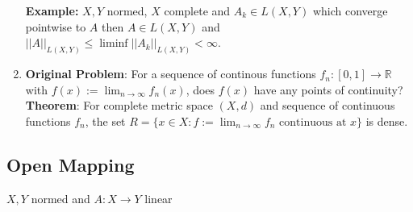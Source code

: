 \documentclass{article}
\begin{document}
\begin{enumerate}
    \textbf{Example:} \(X, Y\) normed, \(X\) complete and \(A_k \in L(X,Y)\) which converge pointwise to \(A\) then \(A \in L(X,Y)\) and \(||A||_{L(X,Y)} \leq \liminf ||A_k||_{L(X, Y) } < \infty\). 

    \item \textbf{Original Problem}: For a sequence of continous functions \(f_n : [0,1] \to \mathbb{R}\) with \(f(x) := \lim_{n\to \infty}f_n(x)\), does \(f(x)\) have any points of continuity?\\

    \textbf{Theorem}: For complete metric space \((X,d)\) and sequence of continuous functions \(f_n\), the set \(R = \{x \in X: f :=\lim_{n \to \infty} f_n \text{ continuous at }x\} \) is dense.
\end{enumerate}

\subsection*{Open Mapping}

\(X, Y\) normed and \(A:X\to Y\) linear
\end{document}
